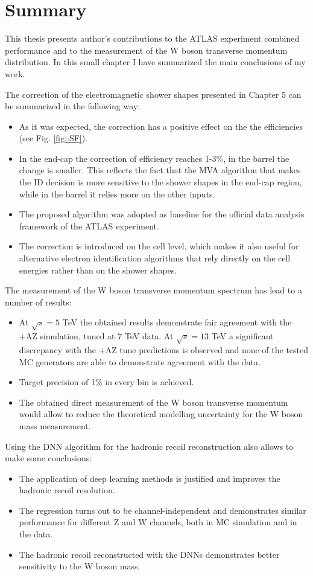 \chapter{Summary}
This thesis presents author's contributions to the ATLAS experiment combined performance and to the measurement of the W boson transverse momentum distribution.  In this small chapter I have summarized the main conclusions of my work. 

The correction of the electromagnetic shower shapes presented in Chapter 5 can be summarized in the following way:
\begin{itemize}
	\item As it was expected, the correction has a positive effect on the the efficiencies (see Fig. \ref{fig::SF}).
	\item In the end-cap the correction of efficiency reaches 1-3\%, in the barrel the change is smaller. This reflects the fact that the MVA algorithm that makes the ID decision is more sensitive to the shower shapes in the end-cap region, while in the barrel it relies more on the other inputs. 
	\item The proposed algorithm was adopted as baseline for the official data analysis framework of the ATLAS experiment.
	\item The correction is introduced on the cell level, which makes it also useful for alternative electron identification algorithms that rely directly on the cell energies rather than on the shower shapes.
\end{itemize}
The measurement of the W boson transverse momentum spectrum has lead to a number of results:
\begin{itemize}
	\item At $\sqrt{s}=5$ TeV the obtained results demonstrate fair agreement with the \Powheg+\Pythia AZ simulation, tuned at 7 TeV data. At $\sqrt{s}=13$ TeV a significant discrepancy with the \Powheg+\Pythia AZ tune predictions is observed and none of the tested MC generators are able to demonstrate agreement with the data.
	\item Target precision of 1\% in every bin is achieved.
	\item The obtained direct measurement of the W boson transverse momentum would allow to reduce the theoretical modelling uncertainty for the W boson mass measurement.
\end{itemize}
Using the DNN algorithm for the hadronic recoil reconstruction also allows to make some conclusions:
\begin{itemize}
	\item The application of deep learning methods is justified and improves the hadronic recoil resolution.
	\item The regression turns out to be channel-independent and demonstrates similar performance for different Z and W channels, both in MC simulation and in the data.
	\item The hadronic recoil reconstructed with the DNNs demonstrates better sensitivity to the W boson mass.
\end{itemize}
